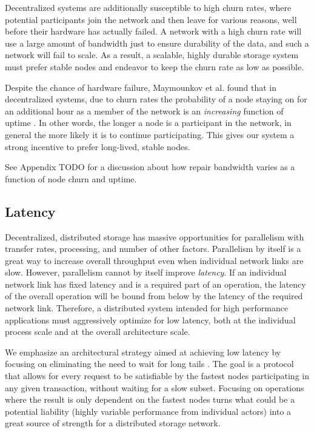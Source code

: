 \documentclass[a4paper,10pt]{article} \usepackage[utf8]{inputenc}
\newcommand{\todo}[1]{{\color{red} TODO #1 }}
\begin{document}
Decentralized systems are additionally susceptible to high churn rates, where
potential participants join the network and then leave for various reasons, well
before their hardware has actually failed. A network with a high churn rate will
use a large amount of bandwidth just to ensure durability of the data, and such
a network will fail to scale. As a result, a scalable, highly durable storage
system must prefer stable nodes and endeavor to keep the churn rate as low as
possible.

Despite the chance of hardware failure, Maymounkov et al. found that in
decentralized systems, due to churn rates the probability of a node staying on
for an additional hour as a member of the network is an {\em increasing}
function of uptime \cite{kad}. In other words, the longer a node is a
participant in the network, in general the more likely it is to continue
participating. This gives our system a strong incentive to prefer long-lived,
stable nodes.

See Appendix \todo{} for a discussion about how repair bandwidth varies as a
function of node churn and uptime.

\subsection{Latency}

Decentralized, distributed storage has massive opportunities for parallelism
with transfer rates, processing, and number of other factors. Parallelism by
itself is a great way to increase overall throughput even when individual
network links are slow. However, parallelism cannot by itself improve {\em
latency}. If an individual network link has fixed latency and is a required part
of an operation, the latency of the overall operation will be bound from below
by the latency of the required network link. Therefore, a distributed system
intended for high performance applications must aggressively optimize for low
latency, both at the individual process scale and at the overall architecture
scale.

We emphasize an architectural strategy aimed at achieving low latency by
focusing on eliminating the need to wait for long tails \cite{tail-at-scale}.
The goal is a protocol that allows for every request to be satisfiable by the
fastest nodes participating in any given transaction, without waiting for a slow
subset. Focusing on operations where the result is only dependent on the fastest
nodes turns what could be a potential liability (highly variable performance
from individual actors) into a great source of strength for a distributed
storage network.
\end{document}
